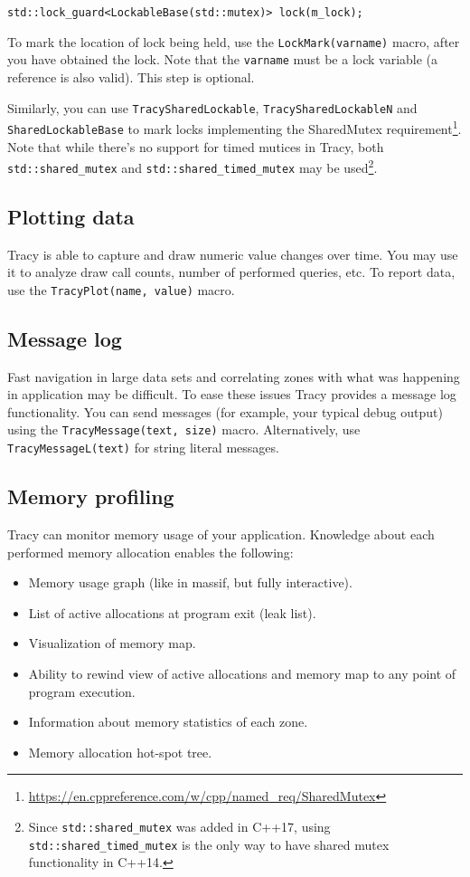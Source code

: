 \documentclass[hidelinks,titlepage,a4paper]{article}
\begin{document}
\begin{lstlisting}
std::lock_guard<LockableBase(std::mutex)> lock(m_lock);
\end{lstlisting}

To mark the location of lock being held, use the \texttt{LockMark(varname)} macro, after you have obtained the lock. Note that the \texttt{varname} must be a lock variable (a reference is also valid). This step is optional.

Similarly, you can use \texttt{TracySharedLockable}, \texttt{TracySharedLockableN} and \texttt{SharedLockableBase} to mark locks implementing the SharedMutex requirement\footnote{\url{https://en.cppreference.com/w/cpp/named_req/SharedMutex}}. Note that while there's no support for timed mutices in Tracy, both \texttt{std::shared\_mutex} and \texttt{std::shared\_timed\_mutex} may be used\footnote{Since \texttt{std::shared\_mutex} was added in C++17, using \texttt{std::shared\_timed\_mutex} is the only way to have shared mutex functionality in C++14.}.

\subsection{Plotting data}

Tracy is able to capture and draw numeric value changes over time. You may use it to analyze draw call counts, number of performed queries, etc. To report data, use the \texttt{TracyPlot(name, value)} macro.

\subsection{Message log}

Fast navigation in large data sets and correlating zones with what was happening in application may be difficult. To ease these issues Tracy provides a message log functionality. You can send messages (for example, your typical debug output) using the \texttt{TracyMessage(text, size)} macro. Alternatively, use \texttt{TracyMessageL(text)} for string literal messages.

\subsection{Memory profiling}

Tracy can monitor memory usage of your application. Knowledge about each performed memory allocation enables the following:

\begin{itemize}
\item Memory usage graph (like in massif, but fully interactive).
\item List of active allocations at program exit (leak list).
\item Visualization of memory map.
\item Ability to rewind view of active allocations and memory map to any point of program execution.
\item Information about memory statistics of each zone.
\item Memory allocation hot-spot tree.
\end{itemize}
\end{document}
